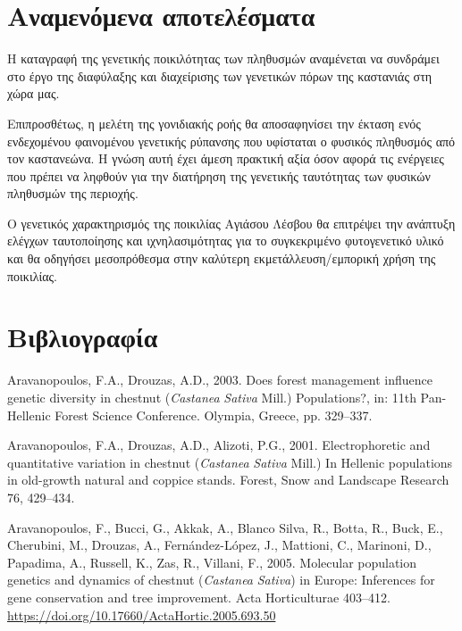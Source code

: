 \documentclass[12pt,a4paper,]{report}
\begin{document}
\hypertarget{-}{%
\section{Αναμενόμενα αποτελέσματα}\label{-}}

H καταγραφή της γενετικής ποικιλότητας των πληθυσμών αναμένεται να
συνδράμει στο έργο της διαφύλαξης και διαχείρισης των γενετικών πόρων
της καστανιάς στη χώρα μας.

Επιπροσθέτως, η μελέτη της γονιδιακής ροής θα αποσαφηνίσει την έκταση
ενός ενδεχομένου φαινομένου γενετικής ρύπανσης που υφίσταται ο φυσικός
πληθυσμός από τον καστανεώνα. Η γνώση αυτή έχει άμεση πρακτική αξία όσον
αφορά τις ενέργειες που πρέπει να ληφθούν για την διατήρηση της
γενετικής ταυτότητας των φυσικών πληθυσμών της περιοχής.

Ο γενετικός χαρακτηρισμός της ποικιλίας Αγιάσου Λέσβου θα επιτρέψει την
ανάπτυξη ελέγχων ταυτοποίησης και ιχνηλασιμότητας για το συγκεκριμένο
φυτογενετικό υλικό και θα οδηγήσει μεσοπρόθεσμα στην καλύτερη
εκμετάλλευση/εμπορική χρήση της ποικιλίας.

\section{Βιβλιογραφία}

\hypertarget{refs}{}
\leavevmode\hypertarget{ref-aravanopoulos_does_2003}{}%
Aravanopoulos, F.A., Drouzas, A.D., 2003. Does forest management
influence genetic diversity in chestnut (\emph{Castanea} \emph{Sativa}
Mill.) Populations?, in: 11th Pan-Hellenic Forest Science Conference.
Olympia, Greece, pp. 329--337.

\leavevmode\hypertarget{ref-Aravanopoulos2001}{}%
Aravanopoulos, F.A., Drouzas, A.D., Alizoti, P.G., 2001. Electrophoretic
and quantitative variation in chestnut (\emph{Castanea} \emph{Sativa}
Mill.) In Hellenic populations in old-growth natural and coppice stands.
Forest, Snow and Landscape Research 76, 429--434.

\leavevmode\hypertarget{ref-aravanopoulos_molecular_2005}{}%
Aravanopoulos, F., Bucci, G., Akkak, A., Blanco Silva, R., Botta, R.,
Buck, E., Cherubini, M., Drouzas, A., Fernández-López, J., Mattioni, C.,
Marinoni, D., Papadima, A., Russell, K., Zas, R., Villani, F., 2005.
Molecular population genetics and dynamics of chestnut (\emph{Castanea}
\emph{Sativa}) in Europe: Inferences for gene conservation and tree
improvement. Acta Horticulturae 403--412.
\url{https://doi.org/10.17660/ActaHortic.2005.693.50}
\end{document}
